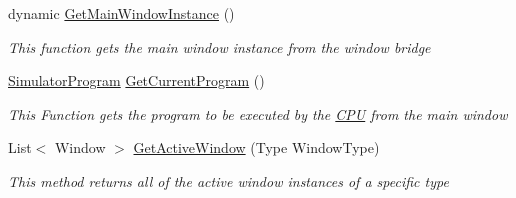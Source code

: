 \begin{DoxyCompactItemize}
\item 
dynamic \hyperlink{class_c_p_u___o_s___simulator_1_1_c_p_u_1_1_instruction_a6b21a943b331f1c15871302e1ba66882}{Get\+Main\+Window\+Instance} ()
\begin{DoxyCompactList}\small\item\em This function gets the main window instance from the window bridge \end{DoxyCompactList}\item 
\hyperlink{class_c_p_u___o_s___simulator_1_1_c_p_u_1_1_simulator_program}{Simulator\+Program} \hyperlink{class_c_p_u___o_s___simulator_1_1_c_p_u_1_1_instruction_a64441a8d85d6eef7e4c58794cfcdca3c}{Get\+Current\+Program} ()
\begin{DoxyCompactList}\small\item\em This Function gets the program to be executed by the \hyperlink{namespace_c_p_u___o_s___simulator_1_1_c_p_u}{C\+P\+U} from the main window \end{DoxyCompactList}\item 
List$<$ Window $>$ \hyperlink{class_c_p_u___o_s___simulator_1_1_c_p_u_1_1_instruction_a0db56b05531624fbe8d0075f4318cb50}{Get\+Active\+Window} (Type Window\+Type)
\begin{DoxyCompactList}\small\item\em This method returns all of the active window instances of a specific type \end{DoxyCompactList}\end{DoxyCompactItemize}
